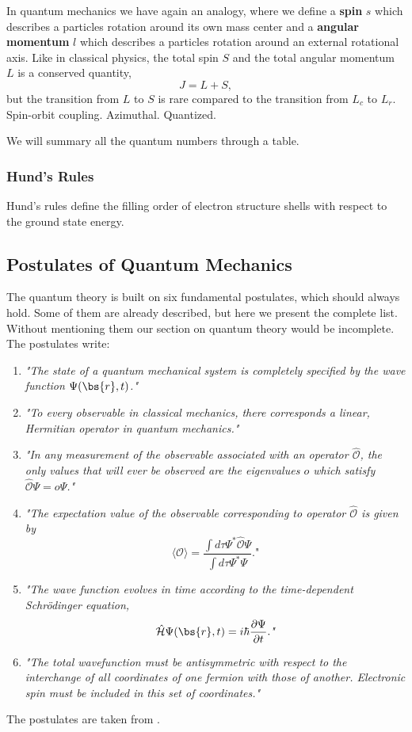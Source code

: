 In quantum mechanics we have again an analogy, where we define a \textbf{spin} $s$ which describes a particles rotation around its own mass center and a \textbf{angular momentum} $l$ which describes a particles rotation around an external rotational axis. Like in classical physics, the total spin $S$ and the total angular momentum $L$ is a conserved quantity,
\begin{equation}
J=L+S,
\end{equation}
but the transition from $L$ to $S$ is rare compared to the transition from $L_c$ to $L_r$. Spin-orbit coupling. Azimuthal. Quantized.

We will summary all the quantum numbers through a table. 

\subsubsection*{Hund's Rules}
Hund's rules define the filling order of electron structure shells with respect to the ground state energy. 
\fi

\subsection{Postulates of Quantum Mechanics}
The quantum theory is built on six fundamental postulates, which should always hold. Some of them are already described, but here we present the complete list. Without mentioning them our section on quantum theory would be incomplete. The postulates write:

\begin{enumerate}
\item \textit{"The state of a quantum mechanical system is completely specified by the wave function $\Psi(\bs{r},t)$."}

\item \textit{"To every observable in classical mechanics, there corresponds a linear, Hermitian operator in quantum mechanics."}

\item \textit{"In any measurement of the observable associated with an operator $\hat{\mathcal{O}}$, the only values that will ever be observed are the eigenvalues $o$ which satisfy $\hat{\mathcal{O}}\Psi=o\Psi$."}

\item \textit{"The expectation value of the observable corresponding to operator $\hat{\mathcal{O}}$ is given by
$$\langle\mathcal{O}\rangle=\frac{\int d\tau\Psi^*\hat{\mathcal{O}}\Psi}{\int d\tau\Psi^*\Psi}.\textit{"}$$}

\item \textit{"The wave function evolves in time according to the time-dependent Schrödinger equation,
$$\hat{\mathcal{H}}\Psi(\bs{r},t)=i\hbar\frac{\partial\Psi}{\partial t}.\textit{"}$$}

\item \textit{"The total wavefunction must be antisymmetric with respect to the interchange of all coordinates of one fermion with those of another. Electronic spin must be included in this set of coordinates."} 
\end{enumerate}
The postulates are taken from \cite{sherrill_david_postulates_2003}.

